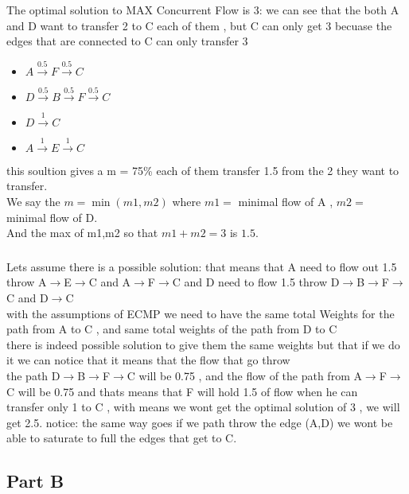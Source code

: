 \documentclass{article}
\begin{document}
\subsubsection{}
The optimal solution to MAX Concurrent Flow is 3:
we can see that the both A and D want to transfer 2 to C each of them , but C can only get 3 becuase the\\
edges that are connected to C can only transfer 3\\ 
\begin{itemize}
    \item $A \xrightarrow{0.5}F\xrightarrow{0.5}C$
    \item $D \xrightarrow{0.5}B\xrightarrow{0.5}F\xrightarrow{0.5}C$
    \item $D \xrightarrow{1}C$
    \item $A \xrightarrow{1}E\xrightarrow{1}C$
\end{itemize}
this soultion gives a m = 75\% each of them transfer 1.5 from the 2 they want to transfer.\\
We say the $m = \min(m1,m2)$ where $m1 =$ minimal flow of A , $m2 =$ minimal flow of D.\\
And the max of m1,m2 so that $m1+m2 = 3$ is $1.5$.
\subsubsection{}
Lets assume there is a possible solution:
that means that A need to flow out 1.5 throw A$\rightarrow$E$\rightarrow$C and A$\rightarrow$F$\rightarrow$C and D need to flow 1.5 throw D$\rightarrow$B$\rightarrow$F$\rightarrow$C and D$\rightarrow$C\\
with the assumptions of ECMP we need to have the same total Weights for the path from A to C , and same total weights of the path from D to C\\
there is indeed possible solution to give them the same weights but that if we do it we can notice that it means that the flow that go throw \\
the path D$\rightarrow$B$\rightarrow$F$\rightarrow$C will be 0.75 , and the flow of the path from A$\rightarrow$F$\rightarrow$C will be 0.75 and thats means that F will hold 1.5 of flow when he can\\
transfer only 1 to C , with means we wont get the optimal solution of 3 , we will get 2.5.
notice: the same way goes if we path throw the edge (A,D) we wont be able to saturate to full the edges that get to C.

\subsection{Part B}
\end{document}
